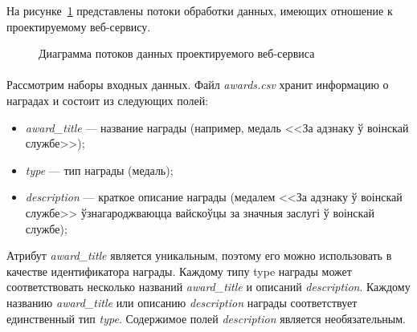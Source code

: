 На рисунке~\ref{fig:activity_diagram} представлены потоки обработки данных,
имеющих отношение к проектируемому веб-сервису.

\begin{figure}[h!]
  \centering
  \small{
    
  }
  \caption{Диаграмма потоков данных проектируемого веб-сервиса}
  \label{fig:activity_diagram}
\end{figure}

\paragraph{}
Рассмотрим наборы входных данных.
Файл \textit{awards.csv} хранит информацию о наградах и состоит из
следующих полей:
\begin{itemize}
\item
  \textit{award\_title} --- название награды
  (например, медаль <<За адзнаку ў воінскай службе>>);
\item
  \textit{type} --- тип награды
  (медаль);
\item
  \textit{description} --- краткое описание награды
  (медалем <<За адзнаку ў воінскай службе>>
  ўзнагароджваюцца вайскоўцы за значныя заслугі ў воінскай службе);
\end{itemize}

Атрибут \textit{award\_title} является уникальным, поэтому его можно использовать
в качестве идентификатора награды.
Каждому типу type награды может соответствовать несколько названий 
\textit{award\_title} и описаний \textit{description}.
Каждому названию \textit{award\_title} или описанию \textit{description} награды
соответствует единственный тип \textit{type}.
Содержимое полей \textit{description} является необязательным.

